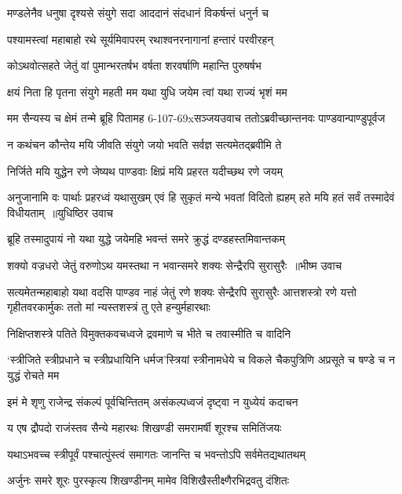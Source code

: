 \twolineshloka
{मण्डलेनैव धनुषा दृश्यसे संयुगे सदा}
{आददानं संदधानं विकर्षन्तं धनुर्न च}


\twolineshloka
{पश्यामस्त्वां महाबाहो रथे सूर्यमिवापरम्}
{रथाश्वनरनागानां हन्तारं परवीरहन्}


\twolineshloka
{कोऽथवोत्सहते जेतुं वां पुमान्भरतर्षभ}
{वर्षता शरवर्षाणि महान्ति पुरुषर्षभ}


\twolineshloka
{क्षयं निता हि पृतना संयुगे महती मम}
{यथा युधि जयेम त्वां यथा राज्यं भृशं मम}


\threelineshloka
{मम सैन्यस्य च क्षेमं तन्मे ब्रूहि पितामह}
{6-107-69xसञ्जयउवाच}
{ततोऽब्रवीच्छान्तनवः पाण्डवान्पाण्डुपूर्वज}


\twolineshloka
{न कथंचन कौन्तेय मयि जीवति संयुगे}
{जयो भवति सर्वज्ञ सत्यमेतद्ब्रवीमि ते}


\twolineshloka
{निर्जिते मयि युद्धेन रणे जेष्यथ पाण्डवाः}
{क्षिप्रं मयि प्रहरत यदीच्छथ रणे जयम्}


\fourlineindentedshloka
{अनुजानामि वः पार्थाः प्रहरध्वं यथासुखम्}
{एवं हि सुकृतं मन्ये भवतां विदितो ह्यहम्}
{हते मयि हतं सर्वं तस्मादेवं विधीयताम् ॥युधिष्ठिर उवाच}
{}


\twolineshloka
{ब्रूहि तस्मादुपायं नो यथा युद्धे जयेमहि}
{भवन्तं समरे क्रुद्धं दण्डहस्तमिवान्तकम्}


\threelineshloka
{शक्यो वज्रधरो जेतुं वरुणोऽथ यमस्तथा}
{न भवान्समरे शक्यः सेन्द्रैरपि सुरासुरैः ॥भीष्म उवाच}
{}


सत्यमेतन्महाबाहो यथा वदसि पाण्डव
\threelineshloka
{नाहं जेतुं रणे शक्यः सेन्द्रैरपि सुरासुरैः}
{आत्तशस्त्रो रणे यत्तो गृहीतवरकार्मुकः}
{ततो मां न्यस्तशस्त्रं तु एते हन्युर्महारथाः}


\twolineshloka
{निक्षिप्तशस्त्रे पतिते विमुक्तकवचध्वजे}
{द्रवमाणे च भीते च तवास्मीति च वादिनि}


\twolineshloka
{`स्त्रीजिते स्त्रीप्रधाने च स्त्रीप्रधायिनि धर्मज'स्त्रियां स्त्रीनामधेये च विकले चैकपुत्रिणि}
{अप्रसूते च षण्डे च न युद्धं रोचते मम}


\twolineshloka
{इमं मे शृणु राजेन्द्र संकल्पं पूर्वचिन्तितम्}
{असंकल्पध्वजं दृष्ट्वा न युध्येयं कदाचन}


\twolineshloka
{य एष द्रौपदो राजंस्तव सैन्ये महारथः}
{शिखण्डी समरामर्षी शूरश्च समितिंजयः}


\twolineshloka
{यथाऽभवच्च स्त्रीपूर्वं पश्चात्पुंस्त्वं समागतः}
{जानन्ति च भवन्तोऽपि सर्वमेतद्यथातथम्}


\twolineshloka
{अर्जुनः समरे शूरः पुरस्कृत्य शिखण्डीनम्}
{मामेव विशिखैस्तीक्ष्णैरभिद्रवतु दंशितः}


